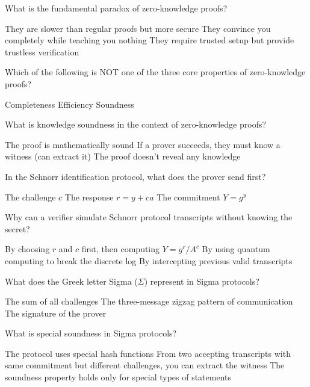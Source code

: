 \documentclass[10pt,a4paper,american]{exam}
\begin{document}
\begin{questions}
	\question What is the fundamental paradox of zero-knowledge proofs?
	\begin{randomizechoices}
		\choice They are slower than regular proofs but more secure
		\CorrectChoice They convince you completely while teaching you nothing
		\choice They require trusted setup but provide trustless verification
	\end{randomizechoices}

	\question Which of the following is NOT one of the three core properties of zero-knowledge proofs?
	\begin{randomizechoices}
		\choice Completeness
		\CorrectChoice Efficiency
		\choice Soundness
	\end{randomizechoices}

	\question What is knowledge soundness in the context of zero-knowledge proofs?
	\begin{randomizechoices}
		\choice The proof is mathematically sound
		\CorrectChoice If a prover succeeds, they must know a witness (can extract it)
		\choice The proof doesn't reveal any knowledge
	\end{randomizechoices}

	\question In the Schnorr identification protocol, what does the prover send first?
	\begin{randomizechoices}
		\choice The challenge $c$
		\choice The response $r = y + ca$
		\CorrectChoice The commitment $Y = g^y$
	\end{randomizechoices}

	\question Why can a verifier simulate Schnorr protocol transcripts without knowing the secret?
	\begin{randomizechoices}
		\CorrectChoice By choosing $r$ and $c$ first, then computing $Y = g^r / A^c$
		\choice By using quantum computing to break the discrete log
		\choice By intercepting previous valid transcripts
	\end{randomizechoices}

	\question What does the Greek letter Sigma ($\Sigma$) represent in Sigma protocols?
	\begin{randomizechoices}
		\choice The sum of all challenges
		\CorrectChoice The three-message zigzag pattern of communication
		\choice The signature of the prover
	\end{randomizechoices}

	\question What is special soundness in Sigma protocols?
	\begin{randomizechoices}
		\choice The protocol uses special hash functions
		\CorrectChoice From two accepting transcripts with same commitment but different challenges, you can extract the witness
		\choice The soundness property holds only for special types of statements
	\end{randomizechoices}


\end{questions}
\end{document}
